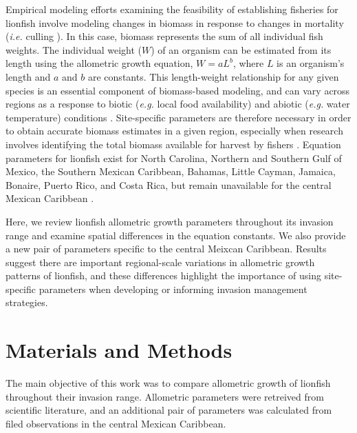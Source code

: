 \documentclass[fleqn,10pt,lineno]{wlpeerj} %
\begin{document}
Empirical modeling efforts examining the feasibility of establishing
fisheries for lionfish involve modeling changes in biomass in response
to changes in mortality (\emph{i.e.} culling
\citep{cote_2014,barbour_2011,andradibrown_2017}). In this case, biomass
represents the sum of all individual fish weights. The individual weight
(\(W\)) of an organism can be estimated from its length using the
allometric growth equation, \(W = aL^b\), where \(L\) is an organism's
length and \(a\) and \(b\) are constants. This length-weight
relationship for any given species is an essential component of
biomass-based modeling, and can vary across regions as a response to
biotic (\emph{e.g.} local food availability) and abiotic (\emph{e.g.}
water temperature) conditions \citep{johnson_2016}. Site-specific
parameters are therefore necessary in order to obtain accurate biomass
estimates in a given region, especially when research involves
identifying the total biomass available for harvest by fishers
\citep{barbour_2011,morris_2011,johnston_2015,chin_2016}. Equation
parameters for lionfish exist for North Carolina, Northern and Southern
Gulf of Mexico, the Southern Mexican Caribbean, Bahamas, Little Cayman,
Jamaica, Bonaire, Puerto Rico, and Costa Rica, but remain unavailable
for the central Mexican Caribbean
\citep{barbour_2011,fogg_2013,dahl_2014,aguilarperera_2016,sabidoitza_2016,sabidoitz_2016,darling_2011,edwards_2014,chin_2016,deleon_2013,toledohernndez_2014,sandel_2015}.

Here, we review lionfish allometric growth parameters throughout its
invasion range and examine spatial differences in the equation
constants. We also provide a new pair of parameters specific to the
central Meixcan Caribbean. Results suggest there are important
regional-scale variations in allometric growth patterns of lionfish, and
these differences highlight the importance of using site-specific
parameters when developing or informing invasion management strategies.

\clearpage

\section*{Materials and Methods}

The main objective of this work was to compare allometric growth of
lionfish throughout their invasion range. Allometric parameters were
retreived from scientific literature, and an additional pair of
parameters was calculated from filed observations in the central Mexican
Caribbean.
\end{document}
